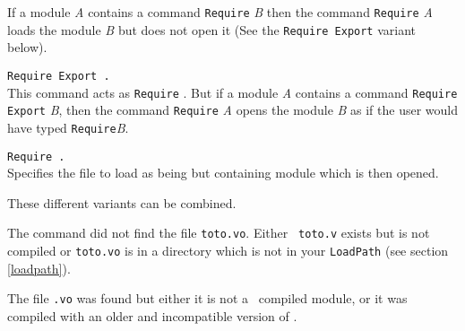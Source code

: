 If a module {\it A} contains a command {\tt Require} {\it B} then the
command {\tt Require} {\it A} loads the module {\it B} but does not
open it (See the {\tt Require Export} variant below).

\begin{Variants}
\item {\tt Require Export {\qualid}.}\\
  This command acts as {\tt Require} {\qualid}.  But if a module {\it
    A} contains a command {\tt Require Export} {\it B}, then the
  command {\tt Require} {\it A} opens the module {\it B} as if the
  user would have typed {\tt Require}{\it B}.

\item {\tt Require {\qualid} {\str}.}\\ 
  Specifies the file to load as being {\str} but containing module
  {\qualid} which is then opened.
\end{Variants}

These different variants can be combined.

\begin{ErrMsgs}

\item {}

\item {}

  The command did not find the file {\tt toto.vo}. Either {\tt
    toto.v} exists but is not compiled or {\tt toto.vo} is in a directory
  which is not in your {\tt LoadPath} (see section \ref{loadpath}).

\item {}

  The file {\tt{\ident}.vo} was found but either it is not a \Coq\
  compiled module, or it was compiled with an older and incompatible
  version of \Coq.
\end{ErrMsgs}

